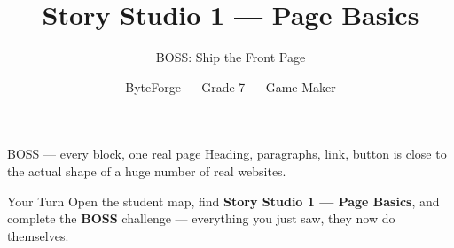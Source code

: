 \documentclass[aspectratio=169]{beamer}
\title{Story Studio 1 — Page Basics}
\subtitle{BOSS: Ship the Front Page}
\author{ByteForge --- Grade 7 --- Game Maker}
\date{}
\begin{document}
\begin{frame}
    \titlepage
\end{frame}

\begin{frame}{BOSS — every block, one real page}
    \Large
    Heading, paragraphs, link, button is close to the actual shape of a huge number of real websites.
\end{frame}

\begin{frame}{Your Turn}
    \Large
    Open the student map, find \textbf{Story Studio 1 — Page Basics}, and complete
    the \textbf{BOSS} challenge --- everything you just saw, they now do themselves.
\end{frame}
\end{document}
